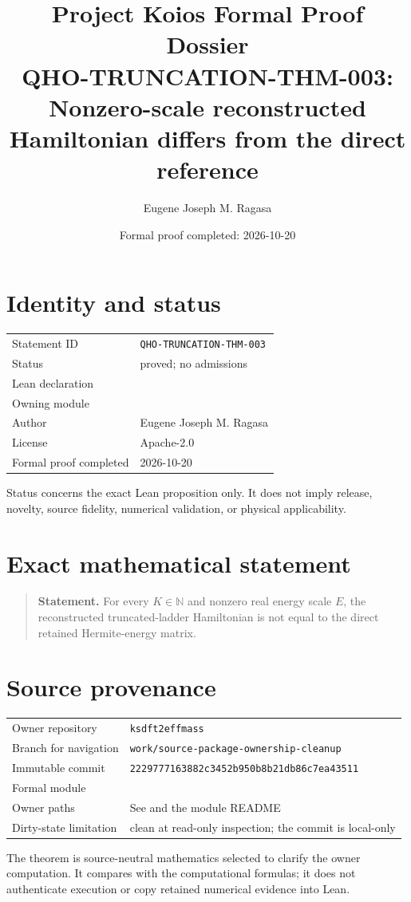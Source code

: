 \documentclass[11pt]{article}
\title{Project Koios Formal Proof Dossier\\\large QHO-TRUNCATION-THM-003: Nonzero-scale reconstructed Hamiltonian differs from the direct reference}
\author{Eugene Joseph M. Ragasa}
\date{Formal proof completed: 2026-10-20}
\begin{document}
\maketitle

\section{Identity and status}
\begin{tabularx}{\textwidth}{@{}lY@{}}\toprule
Statement ID & \texttt{QHO-TRUNCATION-THM-003} \\
Status & proved; no admissions \\
Lean declaration &  \\
Owning module &  \\
Author & Eugene Joseph M. Ragasa \\
License & Apache-2.0 \\
Formal proof completed & 2026-10-20 \\
\bottomrule\end{tabularx}
Status concerns the exact Lean proposition only. It does not imply release, novelty,
source fidelity, numerical validation, or physical applicability.

\section{Exact mathematical statement}
\begin{quote}\textbf{Statement.} For every $K\in\mathbb N$ and nonzero real energy scale $E$, the reconstructed truncated-ladder Hamiltonian is not equal to the direct retained Hermite-energy matrix.\end{quote}

\section{Source provenance}
\begin{tabularx}{\textwidth}{@{}lY@{}}\toprule
Owner repository & \texttt{ksdft2effmass} \\
Branch for navigation & \texttt{work/source-package-ownership-cleanup} \\
Immutable commit & \texttt{2229777163882c3452b950b8b21db86c7ea43511} \\
Formal module &  \\
Owner paths & See  and the module README \\
Dirty-state limitation & clean at read-only inspection; the commit is local-only \\
\bottomrule\end{tabularx}
The theorem is source-neutral mathematics selected to clarify the owner computation. It
compares with the computational formulas; it does not authenticate execution or copy
retained numerical evidence into Lean.
\end{document}
